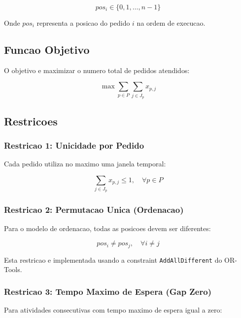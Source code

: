 \documentclass[12pt,a4paper]{article}
\begin{document}
\begin{equation}
pos_i \in \{0, 1, \ldots, n-1\}
\end{equation}

Onde $pos_i$ representa a posicao do pedido $i$ na ordem de execucao.

\subsection{Funcao Objetivo}

O objetivo e maximizar o numero total de pedidos atendidos:

\begin{equation}
\max \sum_{p \in P} \sum_{j \in J_p} x_{p,j}
\end{equation}

\subsection{Restricoes}

\subsubsection{Restricao 1: Unicidade por Pedido}

Cada pedido utiliza no maximo uma janela temporal:

\begin{equation}
\sum_{j \in J_p} x_{p,j} \leq 1, \quad \forall p \in P
\end{equation}

\subsubsection{Restricao 2: Permutacao Unica (Ordenacao)}

Para o modelo de ordenacao, todas as posicoes devem ser diferentes:

\begin{equation}
pos_i \neq pos_j, \quad \forall i \neq j
\end{equation}

Esta restricao e implementada usando a constraint \texttt{AddAllDifferent} do OR-Tools.

\subsubsection{Restricao 3: Tempo Maximo de Espera (Gap Zero)}

Para atividades consecutivas com tempo maximo de espera igual a zero:
\end{document}
